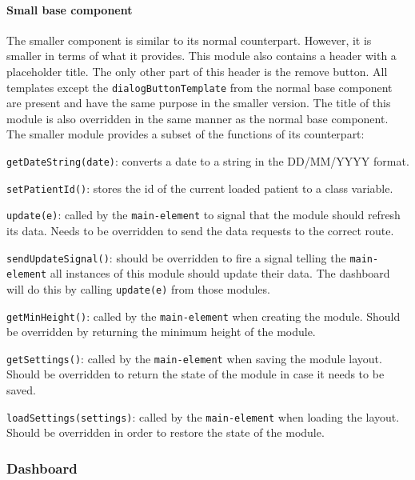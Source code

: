             \paragraph{Small base component} The smaller component is similar to its normal counterpart. However, it is smaller in terms of what it provides. This module also contains a header with a placeholder title. The only other part of this header is the remove button. All templates except the \texttt{dialogButtonTemplate} from the normal base component are present and have the same purpose in the smaller version. The title of this module is also overridden in the same manner as the normal base component. The smaller module provides a subset of the functions of its counterpart:
            \vspace{-6pt}
            \begin{myitemize}
                \item \texttt{getDateString(date)}: converts a date to a string in the DD/MM/YYYY format.
                \item \texttt{setPatientId()}: stores the id of the current loaded patient to a class variable.
                \item \texttt{update(e)}: called by the \texttt{main-element} to signal that the module should refresh its data. Needs to be overridden to send the data requests to the correct route.
                \item \texttt{sendUpdateSignal()}: should be overridden to fire a signal telling the \texttt{main-element} all instances of this module should update their data. The dashboard will do this by calling \texttt{update(e)} from those modules.
                \item \texttt{getMinHeight()}: called by the \texttt{main-element} when creating the module. Should be overridden by returning the minimum height of the module.
                \item \texttt{getSettings()}: called by the \texttt{main-element} when saving the module layout. Should be overridden to return the state of the module in case it needs to be saved.
                \item \texttt{loadSettings(settings)}: called by the \texttt{main-element} when loading the layout. Should be overridden in order to restore the state of the module.
            \end{myitemize}

        \subsubsection{Dashboard}

